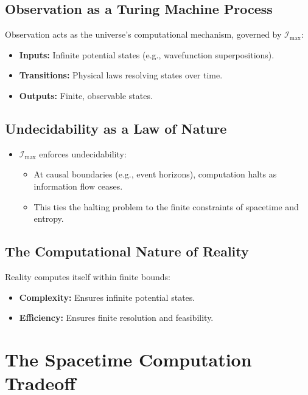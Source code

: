 \documentclass[12pt]{article}
\begin{document}
\subsection{Observation as a Turing Machine Process}

Observation acts as the universe’s computational mechanism, governed by $\mathcal{I}_{\text{max}}$:
\begin{itemize}
    \item \textbf{Inputs:} Infinite potential states (e.g., wavefunction superpositions).
    \item \textbf{Transitions:} Physical laws resolving states over time.
    \item \textbf{Outputs:} Finite, observable states.
\end{itemize}

\subsection{Undecidability as a Law of Nature}

\begin{itemize}
    \item $\mathcal{I}_{\text{max}}$ enforces undecidability:
    \begin{itemize}
        \item At causal boundaries (e.g., event horizons), computation halts as information flow ceases.
        \item This ties the halting problem to the finite constraints of spacetime and entropy.
    \end{itemize}
\end{itemize}

\subsection{The Computational Nature of Reality}

Reality computes itself within finite bounds:
\begin{itemize}
    \item \textbf{Complexity:} Ensures infinite potential states.
    \item \textbf{Efficiency:} Ensures finite resolution and feasibility.
\end{itemize}


\section{The Spacetime Computation Tradeoff}
\end{document}
